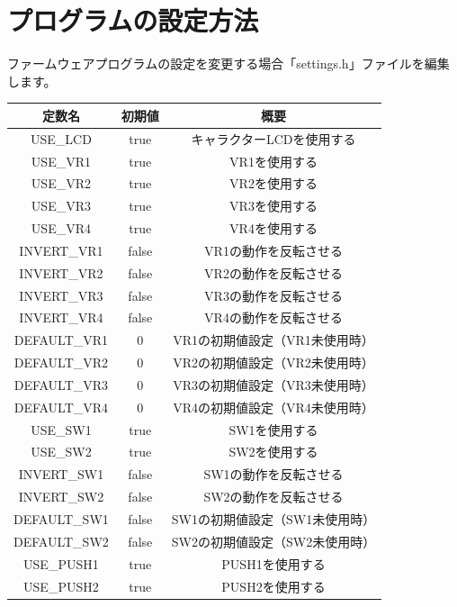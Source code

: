 \documentclass[a4paper,11pt]{jsarticle}
\begin{document}
\clearpage

\section{プログラムの設定方法}
ファームウェアプログラムの設定を変更する場合「settings.h」ファイルを編集します。 \\

\begin{table}[htbp]
\begin{center}
\begin{tabular}{ | c | c | c |}
\hline
\textbf{定数名} & \textbf{初期値} & \textbf{概要} \\\hline
USE\_LCD & true & キャラクターLCDを使用する \\\hline
USE\_VR1 & true & VR1を使用する \\\hline
USE\_VR2 & true & VR2を使用する \\\hline
USE\_VR3 & true & VR3を使用する \\\hline
USE\_VR4 & true & VR4を使用する \\\hline
INVERT\_VR1 & false & VR1の動作を反転させる \\\hline
INVERT\_VR2 & false & VR2の動作を反転させる \\\hline
INVERT\_VR3 & false & VR3の動作を反転させる \\\hline
INVERT\_VR4 & false & VR4の動作を反転させる \\\hline
DEFAULT\_VR1 & 0 & VR1の初期値設定（VR1未使用時） \\\hline
DEFAULT\_VR2 & 0 & VR2の初期値設定（VR2未使用時） \\\hline
DEFAULT\_VR3 & 0 & VR3の初期値設定（VR3未使用時） \\\hline
DEFAULT\_VR4 & 0 & VR4の初期値設定（VR4未使用時） \\\hline
USE\_SW1 & true & SW1を使用する \\\hline
USE\_SW2 & true & SW2を使用する \\\hline
INVERT\_SW1 & false & SW1の動作を反転させる \\\hline
INVERT\_SW2 & false & SW2の動作を反転させる \\\hline
DEFAULT\_SW1 & false & SW1の初期値設定（SW1未使用時） \\\hline
DEFAULT\_SW2 & false & SW2の初期値設定（SW2未使用時） \\\hline
USE\_PUSH1 & true & PUSH1を使用する \\\hline
USE\_PUSH2 & true & PUSH2を使用する \\\hline

\end{tabular}
\end{center}
\end{table}
\end{document}
